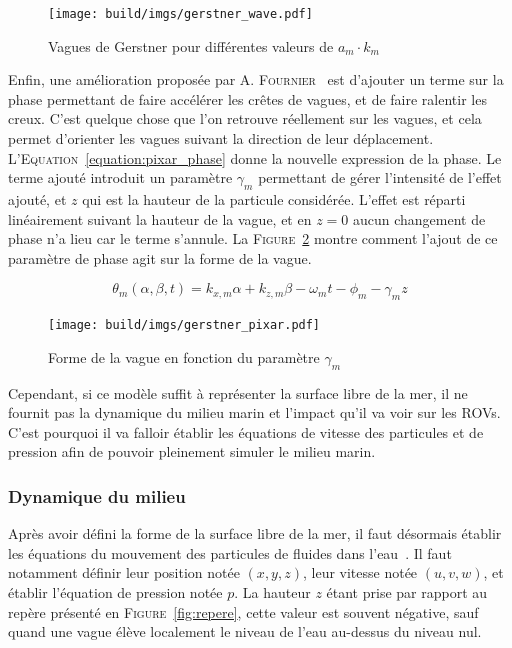 				\begin{figure}[!htb]
					\centering
					\texttt{[image: build/imgs/gerstner\_wave.pdf]}
					\caption{Vagues de Gerstner pour différentes valeurs de $a_m\cdot k_m$}
					\label{fig:amkm}
				\end{figure}

				Enfin, une amélioration proposée par A. \textsc{Fournier}~\cite{Gerstner_Pixar} est d'ajouter un terme sur la phase permettant de faire accélérer les crêtes de vagues, et de faire ralentir les creux. C'est quelque chose que l'on retrouve réellement sur les vagues, et cela permet d'orienter les vagues suivant la direction de leur déplacement. L'\textsc{Equation}~\ref{equation:pixar_phase} donne la nouvelle expression de la phase. Le terme ajouté introduit un paramètre $\gamma_m$ permettant de gérer l'intensité de l'effet ajouté, et $z$ qui est la hauteur de la particule considérée. L'effet est réparti linéairement suivant la hauteur de la vague, et en $z=0$ aucun changement de phase n'a lieu car le terme s'annule. La \textsc{Figure}~\ref{fig:gerstner_pixar} montre comment l'ajout de ce paramètre de phase agit sur la forme de la vague.

				\begin{equation}
					\theta_m(\alpha, \beta, t) = k_{x, m} \alpha + k_{z, m} \beta - \omega_m t - \phi_m - \gamma_m z
					\label{equation:pixar_phase}
				\end{equation}

				\begin{figure}[!htb]
					\centering
					\texttt{[image: build/imgs/gerstner\_pixar.pdf]}
					\caption{Forme de la vague en fonction du paramètre $\gamma_m$}
					\label{fig:gerstner_pixar}
				\end{figure}

				Cependant, si ce modèle suffit à représenter la surface libre de la mer, il ne fournit pas la dynamique du milieu marin et l'impact qu'il va voir sur les \gls{ROV}s. C'est pourquoi il va falloir établir les équations de vitesse des particules et de pression afin de pouvoir pleinement simuler le milieu marin.
				
			\subsubsection{Dynamique du milieu}

				Après avoir défini la forme de la surface libre de la mer, il faut désormais établir les équations du mouvement des particules de fluides dans l'eau~\cite{dean1991water, MIT_Waves}. Il faut notamment définir leur position notée $(x, y, z)$, leur vitesse notée $(u, v, w)$, et établir l'équation de pression notée $p$. La hauteur $z$ étant prise par rapport au repère présenté en \textsc{Figure}~\ref{fig:repere}, cette valeur est souvent négative, sauf quand une vague élève localement le niveau de l'eau au-dessus du niveau nul.

